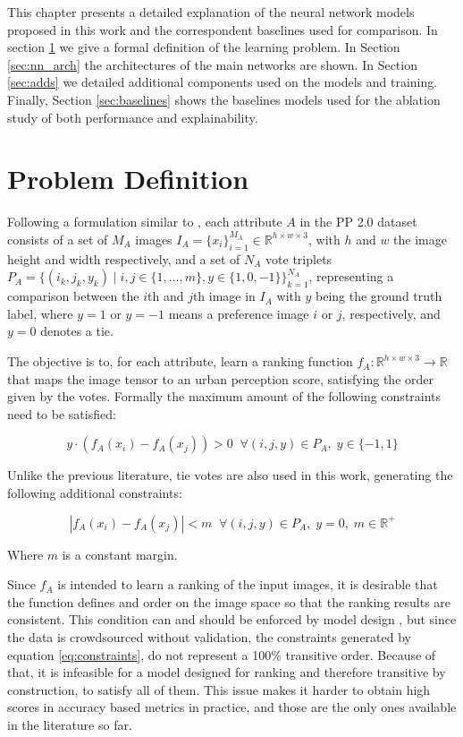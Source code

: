 This chapter presents a detailed explanation of the neural network models proposed in this work and
the correspondent baselines used for comparison. In section \ref{sec:problem_def} we give a formal definition
of the learning problem. In Section \ref{sec:nn_arch} the architectures of
the main networks are shown. In Section \ref{sec:adds} we detailed additional components used on the models and training.
Finally, Section \ref{sec:baselines} shows the baselines models
used for the ablation study of both performance and explainability.


\section{Problem Definition}
\label{sec:problem_def}

Following a formulation similar to , each attribute $A$ in the PP 2.0 dataset consists of a set
of $M_A$ images $I_A = \{x_i\}_{i=1}^{M_A} \in \mathbb{R}^{h \times w \times 3}$, with $h$ and $w$
the image height and width respectively, and a set of $N_A$ vote triplets
$P_A=\{(i_k, j_k, y_k) \;|\; i,j \in \{1, \ldots, m \} , y \in \{1,0,-1\}\}_{k=1}^{N_A}$, representing a comparison
between the $i$th and $j$th image in $I_A$ with $y$ being the ground truth label, where $y=1$ or $y=-1$ means a preference image
$i$ or $j$, respectively, and  $y=0$ denotes a tie.

The objective is to, for each attribute, learn a ranking function $f_A : \mathbb{R}^{h \times w \times 3} \rightarrow \mathbb{R}$
that maps the image tensor to an urban perception score, satisfying the order given by the votes. Formally the
maximum amount of the following constraints need to be satisfied:

\begin{equation}
y \cdot (f_A(x_i) - f_A(x_j)) > 0 \;\; \forall (i,j,y) \in P_A, \; y \in \{-1,1\}
\label{eq:constraints}
\end{equation}

Unlike the previous literature, tie votes are also used in this work, generating the following additional constraints:

\begin{equation}
	|f_A(x_i) - f_A(x_j)| < m \;\; \forall (i,j,y) \in P_A, \; y = 0, \; m \in \mathbb{R}^+
	\label{eq:constraints_ties}
\end{equation}

Where $m$ is a constant margin.

Since $f_A$ is intended to learn a ranking of the input images, it is desirable that the function defines and order
on the image space so that the ranking results are consistent. This condition can and should be enforced by
model design \cite{koppel_pairwise}, but since the data is crowdsourced without
validation, the constraints generated by equation \ref{eq:constraints}, do not represent a  100\% transitive order.
Because of that, it is infeasible for a model designed for ranking and therefore
transitive by construction, to satisfy all of them.
This issue makes it harder to obtain high scores in accuracy based metrics in practice, and
those are the only ones available in the literature so far.


